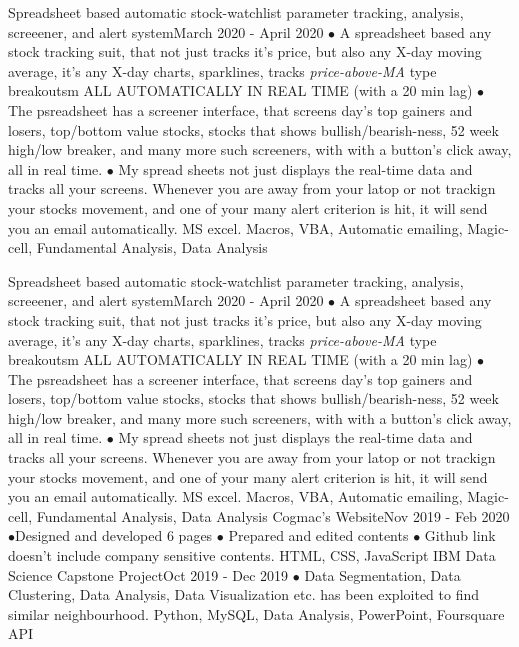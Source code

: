 \begin{projects}
    \project
    {Spreadsheet based automatic stock-watchlist parameter tracking, analysis, screeener, and alert system}{March 2020 - April 2020}
    {}
    {$\bullet$ A spreadsheet based any stock tracking suit, that not just tracks it's price, but also any X-day moving average, it's any X-day charts, sparklines, tracks \textit{price-above-MA} type breakoutsm ALL AUTOMATICALLY IN REAL TIME (with a 20 min lag) $\bullet$ The psreadsheet has a screener interface, that screens day's top gainers and losers, top/bottom value stocks, stocks that shows bullish/bearish-ness, 52 week high/low breaker, and many more such screeners, with with a button's click away, all in real time.  $\bullet$ My spread sheets not just displays the real-time data and tracks all your screens. Whenever you are away from your latop or not trackign your stocks movement, and one of your many alert criterion is hit, it will send you an email automatically.}
    {MS excel. Macros, VBA, Automatic emailing, Magic-cell, Fundamental Analysis, Data Analysis}
    
     
    \project
    {Spreadsheet based automatic stock-watchlist parameter tracking, analysis, screeener, and alert system}{March 2020 - April 2020}
    {}
    {$\bullet$ A spreadsheet based any stock tracking suit, that not just tracks it's price, but also any X-day moving average, it's any X-day charts, sparklines, tracks \textit{price-above-MA} type breakoutsm ALL AUTOMATICALLY IN REAL TIME (with a 20 min lag) $\bullet$ The psreadsheet has a screener interface, that screens day's top gainers and losers, top/bottom value stocks, stocks that shows bullish/bearish-ness, 52 week high/low breaker, and many more such screeners, with with a button's click away, all in real time.  $\bullet$ My spread sheets not just displays the real-time data and tracks all your screens. Whenever you are away from your latop or not trackign your stocks movement, and one of your many alert criterion is hit, it will send you an email automatically.}
    {MS excel. Macros, VBA, Automatic emailing, Magic-cell, Fundamental Analysis, Data Analysis}
   \project   
    {Cogmac's Website}{Nov 2019 - Feb 2020}
    { }
    {$\bullet$Designed and developed 6 pages $\bullet$ Prepared and edited contents $\bullet$ Github link doesn't include company sensitive contents.}
    {HTML, CSS, JavaScript}
    \project
    {IBM Data Science Capstone Project}{Oct 2019 - Dec 2019}
    {  }
    {$\bullet$ Data Segmentation, Data Clustering, Data Analysis, Data Visualization etc. has been exploited to find similar neighbourhood.}
    {Python, MySQL, Data Analysis, PowerPoint, Foursquare API}
    

\end{projects}

